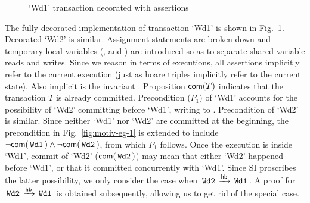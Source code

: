 \begin{figure}

\caption{`Wd1' transaction decorated with assertions}
\label{fig:wd1-decorated}
\end{figure}

The fully decorated implementation of transaction `Wd1' is shown in
Fig.~\ref{fig:wd1-decorated}. Decorated `Wd2' is similar. Assignment
statements are broken down and temporary local variables (,
 and ) are introduced so as to separate shared variable
reads and writes.  Since we reason in terms of executions, all
assertions implicitly refer to the current execution (just as hoare
triples implicitly refer to the current state). Also implicit is the
invariant . Proposition $\textsf{com}(T)$ indicates
that the transaction $T$ is already committed. Precondition ($P_1$) of
`Wd1' accounts for the possibility of `Wd2' committing before `Wd1',
writing  to .  Precondition of `Wd2' is similar.  Since
neither `Wd1' nor `Wd2' are committed at the beginning, the
precondition in Fig.~\ref{fig:motiv-eg-1} is extended to include
$\neg\textsf{com}(\,{\tt Wd1}\,) \wedge \neg\textsf{com}(\,{\tt Wd2}\,)$, from which
$P_1$ follows. Once the execution is inside `Wd1', commit of `Wd2'
($\textsf{com}(\,{\tt Wd2}\,)$) may mean that either `Wd2' happened before
`Wd1', or that it committed concurrently with `Wd1'. Since SI
proscribes the latter possibility, we only consider the case when
$\,{\tt Wd2}\, \xrightarrow{\textsf{hb}} \,{\tt Wd1}\,$. A proof for $\,{\tt Wd2}\, \xrightarrow{\textsf{hb}} \,{\tt Wd1}\,$ is
obtained subsequently, allowing us to get rid of the special case.

